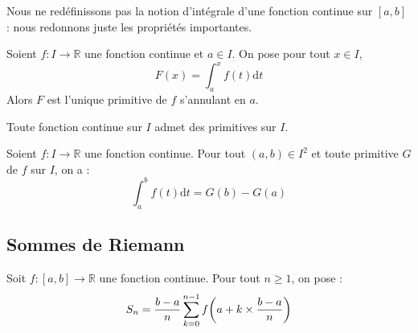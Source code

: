 \documentclass[french,11pt,twoside]{VcCours}
\newcommand{\dt}{\text{d}t}
\begin{document}
Nous ne redéfinissons pas la notion d'intégrale d'une fonction continue sur $[a,b]$ : nous redonnons juste les propriétés importantes.


\begin{Theoreme}{} Soient $f:  I \rightarrow \mathbb{R}$ une fonction continue et $a \in I$. On pose pour tout $x \in I$,
$$ F(x) = \int_{a}^x f(t) \dt $$
Alors $F$ est l'unique primitive de $f$ s'annulant en $a$.
\end{Theoreme}

\begin{Corollaire}{} Toute fonction continue sur $I$ admet des primitives sur $I$.
\end{Corollaire}

\begin{Corollaire}{} Soient $f:  I \rightarrow \mathbb{R}$ une fonction continue. Pour tout $(a,b) \in I^2$ et toute primitive $G$ de $f$ sur $I$, on a :
$$ \int_{a}^b f(t) \dt = G(b)-G(a)$$
\end{Corollaire}

%
%

\subsection{Sommes de Riemann}

Soit $f : [a,b] \rightarrow \mathbb{R}$ une fonction continue. Pour tout $n \geq 1$, on pose :
$$S_n = \frac{b-a}{n}\sum_{k=0}^{n-1} f \bigg{(}  a + k \times \frac{b-a}{n} \bigg{)}$$
\end{document}

